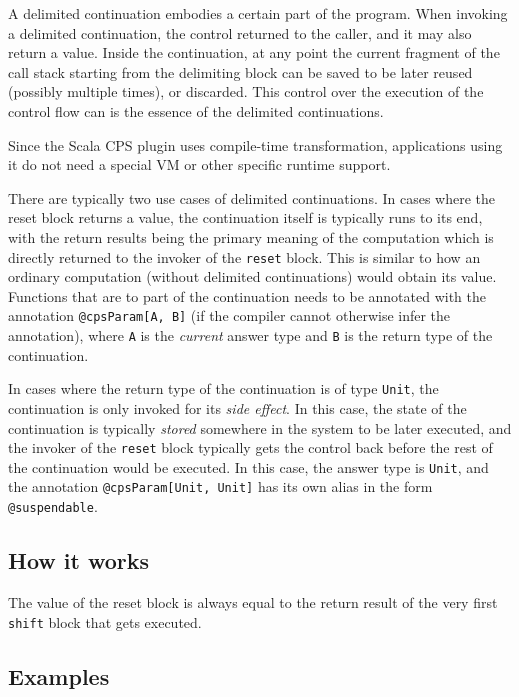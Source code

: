 A delimited continuation embodies a certain part of the program. When invoking a delimited continuation, the control returned to the caller, and it may also return a value. Inside the continuation, at any point the current fragment of the call stack starting from the delimiting block can be saved to be later reused (possibly multiple times), or discarded. This control over the execution of the control flow can is the essence of the delimited continuations.

Since the Scala CPS plugin uses compile-time transformation, applications using it do not need a special VM or other specific runtime support.

There are typically two use cases of delimited continuations. In cases where the reset block returns a value, the continuation itself is typically runs to its end, with the return results being the primary meaning of the computation which is directly returned to the invoker of the \texttt{reset} block. This is similar to how an ordinary computation (without delimited continuations) would obtain its value. Functions that are to part of the continuation needs to be annotated with the annotation \texttt{@cpsParam[A, B]} (if the compiler cannot otherwise infer the annotation), where \texttt{A} is the \emph{current} answer type and \texttt{B} is the return type of the continuation.

In cases where the return type of the continuation is of type \texttt{Unit}, the continuation is only invoked for its \emph{side effect}. In this case, the state of the continuation is typically \emph{stored} somewhere in the system to be later executed, and the invoker of the \texttt{reset} block typically gets the control back before the rest of the continuation would be executed. In this case, the answer type is \texttt{Unit}, and the annotation \texttt{@cpsParam[Unit, Unit]} has its own alias in the form \texttt{@suspendable}.

\subsection{How it works}

The value of the reset block is always equal to the return result of the very first \texttt{shift} block that gets executed.

\subsection{Examples}

